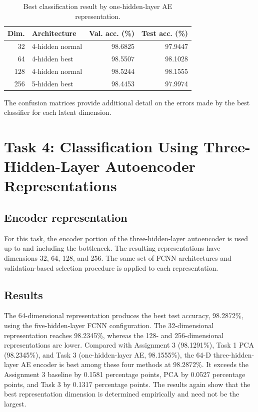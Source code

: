 \documentclass[conference,onecolumn]{IEEEtran}
\begin{document}
\begin{table}[H]
\centering
\small
\caption{Best classification result by one-hidden-layer AE representation.}
\label{tab:task3-results}
\begin{tabular}{r l r r}
\toprule
Dim. & Architecture & Val. acc. (\%) & Test acc. (\%)\\
\midrule
32 & 4-hidden normal & 98.6825 & 97.9447\\
64 & 4-hidden best & 98.5507 & 98.1028\\
128 & 4-hidden normal & 98.5244 & 98.1555\\
256 & 5-hidden best & 98.4453 & 97.9974\\
\bottomrule
\end{tabular}
\end{table}

The confusion matrices provide additional detail on the errors made by the best classifier for each latent dimension.


\FloatBarrier

\section{Task 4: Classification Using Three-Hidden-Layer Autoencoder Representations}
\subsection{Encoder representation}
For this task, the encoder portion of the three-hidden-layer autoencoder is used up to and including the bottleneck. The resulting representations have dimensions 32, 64, 128, and 256. The same set of FCNN architectures and validation-based selection procedure is applied to each representation.

\subsection{Results}
The 64-dimensional representation produces the best test accuracy, 98.2872\%, using the five-hidden-layer FCNN configuration. The 32-dimensional representation reaches 98.2345\%, whereas the 128- and 256-dimensional representations are lower. Compared with Assignment 3 (98.1291\%), Task 1 PCA (98.2345\%), and Task 3
(one-hidden-layer AE, 98.1555\%), the 64-D three-hidden-layer AE encoder is best among
these four methods at 98.2872\%. It exceeds the Assignment 3 baseline by 0.1581
percentage points, PCA by 0.0527 percentage points, and Task 3 by 0.1317 percentage
points. The results again show that the best representation dimension is determined empirically and need not be the largest.
\end{document}
